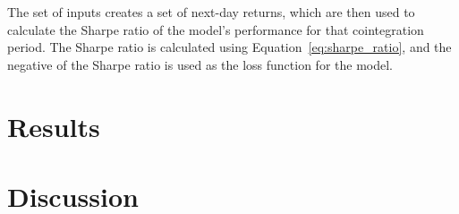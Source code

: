 \documentclass[12pt]{article}
\begin{document}
The set of inputs creates a set of next-day returns, which are then used to calculate the Sharpe ratio of the model's performance for that cointegration period. The Sharpe ratio is calculated using Equation~\ref{eq:sharpe_ratio}, and the negative of the Sharpe ratio is used as the loss function for the model.


 \clearpage




 \section{Results}

 \clearpage





 \section{Discussion}



\clearpage



\end{document}
